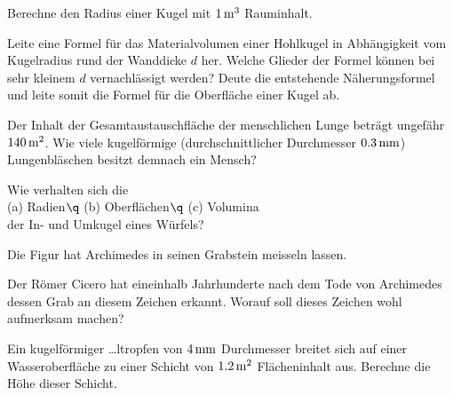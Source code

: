 \documentclass[%
11pt,%
twoside,%
titlepage,%
a4page,%
german,%
headsepline%
]{scrartcl}
\begin{document}
\begin{ueb}
Berechne den Radius einer Kugel mit $\unit[1]{m^3}$ Rauminhalt.
\end{ueb}

\begin{ueb}
Leite eine Formel f\"ur das Materialvolumen einer Hohlkugel in Abh\"angigkeit vom Kugelradius rund der Wanddicke $d$ her. Welche Glieder der Formel k\"onnen bei sehr kleinem $d$ vernachl\"assigt werden? Deute die entstehende N\"aherungsformel und leite somit die Formel f\"ur die Oberfl\"ache einer Kugel ab.
\end{ueb}

\begin{ueb}
Der Inhalt der Gesamtaustauschfl\"ache der menschlichen Lunge betr\"agt ungef\"ahr $\unit[140]{m^2}$. Wie viele kugelf\"ormige (durchschnittlicher Durchmesser $\unit[0.3]{mm}$) Lungenbl\"aschen besitzt demnach ein Mensch?
\end{ueb}

\begin{ueb}
Wie verhalten sich die\\[1ex]
\hspace*{2.7ex}(a) Radien$\q$ (b) Oberfl\"achen$\q$ (c) Volumina\\[1ex]
der In- und Umkugel eines W\"urfels?
\end{ueb}

\begin{ueb}
Die Figur hat Archimedes in seinen Grabstein meisseln lassen.
\begin{center}
\end{center}
Der R\"omer Cicero hat eineinhalb Jahrhunderte nach dem Tode von Archimedes dessen Grab an diesem Zeichen erkannt. Worauf soll dieses Zeichen wohl aufmerksam machen?
\end{ueb}

\begin{ueb}
Ein kugelf\"ormiger …ltropfen von $\unit[4]{mm}$ Durchmesser breitet sich auf einer Wasseroberfl\"ache zu einer Schicht von $\unit[1.2]{m^2}$ Fl\"acheninhalt aus. Berechne die H\"ohe dieser Schicht.
\end{ueb}
\end{document}
